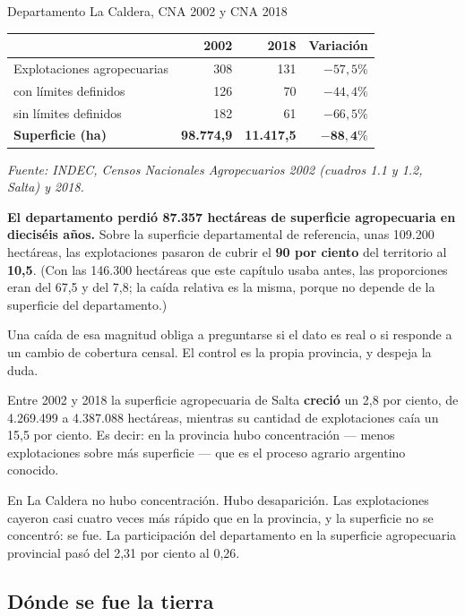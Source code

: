 \begin{ficha}{Departamento La Caldera, CNA 2002 y CNA 2018}
\begin{center}\small
\begin{tabular}{@{}lrrr@{}}
\toprule
 & 2002 & 2018 & Variación \\
\midrule
Explotaciones agropecuarias & 308 & 131 & $-57,5\%$ \\
\quad con límites definidos & 126 & 70 & $-44,4\%$ \\
\quad sin límites definidos & 182 & 61 & $-66,5\%$ \\
\textbf{Superficie (ha)} & \textbf{98.774,9} & \textbf{11.417,5} & $\mathbf{-88,4\%}$ \\
\bottomrule
\end{tabular}
\end{center}
\textit{Fuente: INDEC, Censos Nacionales Agropecuarios 2002 (cuadros 1.1 y 1.2, Salta) y 2018.}
\end{ficha}

\textbf{El departamento perdió 87.357 hectáreas de superficie agropecuaria en dieciséis años.} Sobre la superficie departamental de referencia, unas 109.200 hectáreas, las explotaciones pasaron de cubrir el \textbf{90 por ciento} del territorio al \textbf{10,5}. (Con las 146.300 hectáreas que este capítulo usaba antes, las proporciones eran del 67,5 y del 7,8; la caída relativa es la misma, porque no depende de la superficie del departamento.)

Una caída de esa magnitud obliga a preguntarse si el dato es real o si responde a un cambio de cobertura censal. El control es la propia provincia, y despeja la duda.

Entre 2002 y 2018 la superficie agropecuaria de Salta \textbf{creció} un 2,8 por ciento, de 4.269.499 a 4.387.088 hectáreas, mientras su cantidad de explotaciones caía un 15,5 por ciento. Es decir: en la provincia hubo concentración --- menos explotaciones sobre más superficie --- que es el proceso agrario argentino conocido.

En La Caldera no hubo concentración. Hubo desaparición. Las explotaciones cayeron casi cuatro veces más rápido que en la provincia, y la superficie no se concentró: se fue. La participación del departamento en la superficie agropecuaria provincial pasó del 2,31 por ciento al 0,26.

\subsection*{Dónde se fue la tierra}

